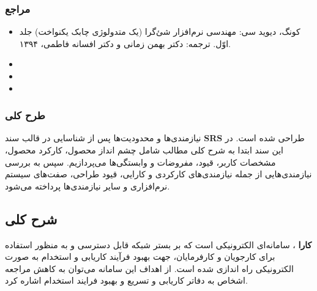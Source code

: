 \documentclass[12pt]{article}
\begin{document}
	\subsubsection{مراجع}
	\begin{itemize}
		\item
		کونگ، دیوید سی: مهندسی نرم‌افزار شئ‌گرا (یک متدولوژی چابک یکنواخت) جلد اوّل. ترجمه: دکتر بهمن زمانی و دکتر افسانه فاطمی، ۱۳۹۴.
		\item
		\item
		\item

	\end{itemize}

	\subsubsection{طرح کلی}
	نیازمندی‌ها و محدودیت‌ها پس از شناسایی در قالب سند
	 \textbf{SRS}
	 طراحی شده است. در این سند ابتدا به شرح کلی مطالب شامل چشم انداز محصول، کارکرد محصول، مشخصات کاربر، قیود، مفروضات و وابستگی‌ها می‌پردازیم. سپس به بررسی نیازمندی‌هایی از جمله نیازمندی‌های کارکردی و کارایی، قیود طراحی، صفت‌های سیستم نرم‌افزاری و سایر نیازمندی‌ها پرداخته می‌شود.

	\newpage
	\subsection{شرح کلی}
	\textbf{کارا}
	، سامانه‌ای الکترونیکی است که بر بستر شبکه قابل دسترسی و به منظور استفاده برای کارجویان و کارفرمایان، جهت بهبود فرآیند کاریابی و استخدام به صورت الکترونیکی راه اندازی شده است. از اهداف این سامانه می‌توان به کاهش مراجعه اشخاص به دفاتر کاریابی و تسریع و بهبود فرایند استخدام اشاره کرد.
\end{document}
